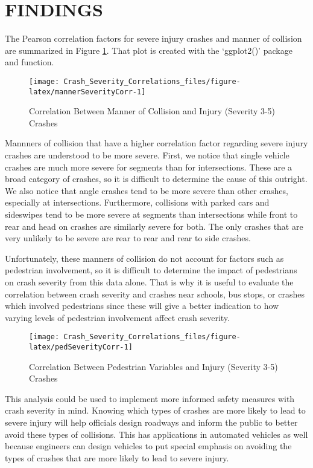 \documentclass[3p, authoryear]{elsarticle} %
\begin{document}
\hypertarget{findings}{%
\section{FINDINGS}\label{findings}}

The Pearson correlation factors for severe injury crashes and manner of collision are summarized in Figure \ref{fig:mannerSeverityCorr}. That plot is created with the `ggplot2()' package and function.

\begin{figure}

{\centering \texttt{[image: Crash\_Severity\_Correlations\_files/figure-latex/mannerSeverityCorr-1]} 

}

\caption{Correlation Between Manner of Collision and Injury (Severity 3-5) Crashes}\label{fig:mannerSeverityCorr}
\end{figure}

Mannners of collision that have a higher correlation factor regarding severe injury crashes are understood to be more severe. First, we notice that single vehicle crashes are much more severe for segments than for intersections. These are a broad category of crashes, so it is difficult to determine the cause of this outright. We also notice that angle crashes tend to be more severe than other crashes, especially at intersections. Furthermore, collisions with parked cars and sideswipes tend to be more severe at segments than intersections while front to rear and head on crashes are similarly severe for both. The only crashes that are very unlikely to be severe are rear to rear and rear to side crashes.

Unfortunately, these manners of collision do not account for factors such as pedestrian involvement, so it is difficult to determine the impact of pedestrians on crash severity from this data alone. That is why it is useful to evaluate the correlation between crash severity and crashes near schools, bus stops, or crashes which involved pedestrians since these will give a better indication to how varying levels of pedestrian involvement affect crash severity.

\begin{figure}

{\centering \texttt{[image: Crash\_Severity\_Correlations\_files/figure-latex/pedSeverityCorr-1]} 

}

\caption{Correlation Between Pedestrian Variables and Injury (Severity 3-5) Crashes}\label{fig:pedSeverityCorr}
\end{figure}

This analysis could be used to implement more informed safety measures with crash severity in mind. Knowing which types of crashes are more likely to lead to severe injury will help officials design roadways and inform the public to better avoid these types of collisions. This has applications in automated vehicles as well because engineers can design vehicles to put special emphasis on avoiding the types of crashes that are more likely to lead to severe injury.


\end{document}

